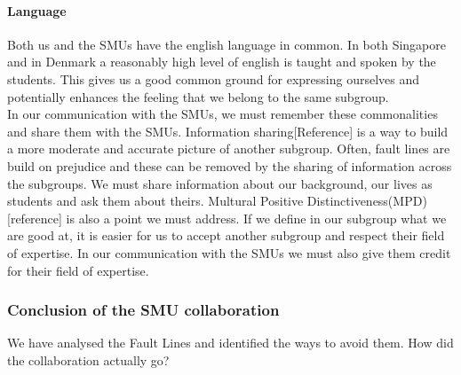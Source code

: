 \documentclass[a4paper,11pt,report]{article}
\begin{document}
\paragraph{Language}
Both us and the SMUs have the english language in common. In both Singapore and in Denmark a reasonably high level of english is taught and spoken by the students. This gives us a good common ground for expressing ourselves and potentially enhances the feeling that we belong to the same subgroup. \\

In our communication with the SMUs, we must remember these commonalities and share them with the SMUs. Information sharing[Reference] is a way to build a more moderate and accurate picture of another subgroup. Often, fault lines are build on prejudice and these can be removed by the sharing of information across the subgroups. We must share information about our background, our lives as students and ask them about theirs. Multural Positive Distinctiveness(MPD)[reference] is also a point we must address. If we define in our subgroup what we are good at, it is easier for us to accept another subgroup and respect their field of expertise. In our communication with the SMUs we must also give them credit for their field of expertise. \\

\subsubsection{Conclusion of the SMU collaboration}

We have analysed the Fault Lines and identified the ways to avoid them. How did the collaboration actually go? \\
\end{document}
